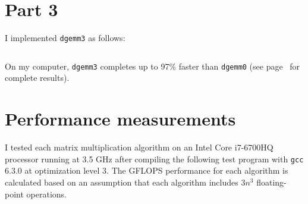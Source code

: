 \documentclass[12pt,letterpaper,oneside]{article}
\begin{document}
 
\section*{Part 3}
I implemented \texttt{dgemm3} as follows:
\inputminted{c}{dgemm3.c}
On my computer, \texttt{dgemm3} completes up to 97\% faster than \texttt{dgemm0} 
(see page~\pageref{results3} for complete results).

\section*{Performance measurements}

I tested each matrix multiplication algorithm on an \label{specs} Intel Core i7-6700HQ processor running at 3.5 GHz after compiling
the following test program with \texttt{gcc} 6.3.0 at optimization level 3. The GFLOPS performance for each algorithm
is calculated based on an assumption that each algorithm includes $3n^3$ floating-point operations.

\inputminted{c}{timing.c}
\end{document}
